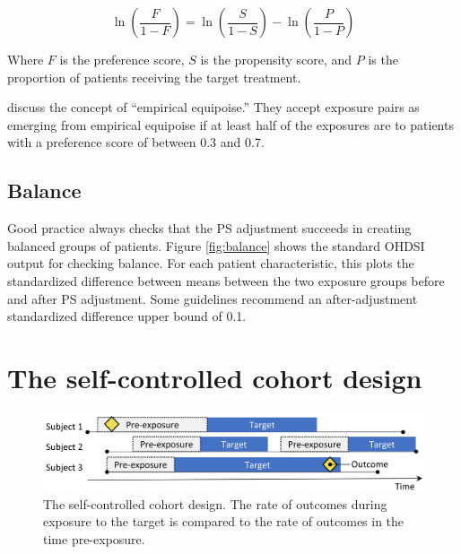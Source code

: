 \documentclass[11pt]{book}
\theoremstyle{definition}
\theoremstyle{definition}
\theoremstyle{definition}
\theoremstyle{remark}
\begin{document}
\[\ln\left(\frac{F}{1-F}\right)=\ln\left(\frac{S}{1-S}\right)-\ln\left(\frac{P}{1-P}\right)\]

Where \(F\) is the preference score, \(S\) is the propensity score, and \(P\) is the proportion of patients receiving the target treatment.

\citet{walker_2013} discuss the concept of ``empirical equipoise.'' They accept exposure pairs as emerging from empirical equipoise if at least half of the exposures are to patients with a preference score of between 0.3 and 0.7. 

\hypertarget{balance}{%
\subsection{Balance}\label{balance}}

 

Good practice always checks that the PS adjustment succeeds in creating balanced groups of patients. Figure \ref{fig:balance} shows the standard OHDSI output for checking balance. For each patient characteristic, this plots the standardized difference between means between the two exposure groups before and after PS adjustment. Some guidelines recommend an after-adjustment standardized difference upper bound of 0.1. \citep{rubin_2001}

\hypertarget{the-self-controlled-cohort-design}{%
\section{The self-controlled cohort design}\label{the-self-controlled-cohort-design}}


\begin{figure}[h]

{\centering \includegraphics[width=0.9\linewidth]{images/PopulationLevelEstimation/selfControlledCohort} 

}

\caption{The self-controlled cohort design. The rate of outcomes during exposure to the target is compared to the rate of outcomes in the time pre-exposure.}\label{fig:scc}
\end{figure}
\end{document}
